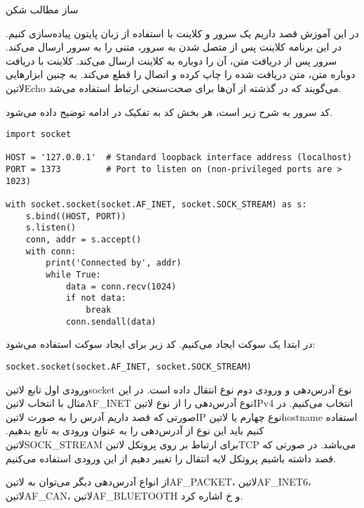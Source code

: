 \documentclass[]{article}
\begin{document}
  ‌ساز
  ‌مطالب
  ‌شکن

  در این آموزش قصد داریم یک سرور و کلاینت‌ با استفاده از زبان پایتون پیاده‌سازی کنیم.
  در این برنامه کلاینت‌ پس از متصل شدن به سرور، متنی را به سرور ارسال می‌کند.
  سرور پس از دریافت متن، آن را دوباره به کلاینت‌ ارسال می‌کند. کلاینت‌ با دریافت‌ دوباره متن، متن دریافت شده را چاپ کرده و اتصال را قطع می‌کند.
  به چنین ابزارهایی ‌لاتین{Echo} می‌گویند که در گذشته از آن‌ها برای صحت‌سنجی ارتباط استفاده می‌شد.


  کد سرور به شرح زیر است، هر بخش کد به تفکیک در ادامه توضیح داده می‌شود.

  \begin{latin}
  \begin{verbatim}
import socket

HOST = '127.0.0.1'  # Standard loopback interface address (localhost)
PORT = 1373         # Port to listen on (non-privileged ports are > 1023)

with socket.socket(socket.AF_INET, socket.SOCK_STREAM) as s:
    s.bind((HOST, PORT))
    s.listen()
    conn, addr = s.accept()
    with conn:
        print('Connected by', addr)
        while True:
            data = conn.recv(1024)
            if not data:
                break
            conn.sendall(data)
  \end{verbatim}
  \end{latin}

 در ابتدا یک سوکت‌ ایجاد می‌کنیم. کد زیر برای ایجاد سوکت‌ استفاده می‌شود:

  \begin{latin}
  \begin{verbatim}
socket.socket(socket.AF_INET, socket.SOCK_STREAM)
  \end{verbatim}
  \end{latin}

  ورودی اول تابع ‌لاتین{socket} نوع آدرس‌دهی و ورودی دوم نوع انتقال داده است‌.
  در این مثال با انتخاب ‌لاتین{AF\_INET} نوع آدرس‌دهی را از نوع ‌لاتین{IPv4} انتخاب می‌کنیم‌.
  در صورتی که قصد داریم آدرس را به صورت ‌لاتین{IP} نوع چهارم یا ‌لاتین{hostname} استفاده کنیم
  باید این نوع از آدرس‌دهی را به عنوان ورودی به تابع بدهیم‌.
  ‌لاتین{SOCK\_STREAM} برای ارتباط بر روی پروتکل ‌لاتین{TCP} می‌باشد.
  در صورتی که قصد داشته باشیم پروتکل لایه انتقال را تغییر دهیم از این ورودی استفاده می‌کنیم.

  از انواع آدرس‌دهی دیگر می‌توان به ‌لاتین{AF\_PACKET}، ‌لاتین{AF\_INET6}، ‌لاتین{AF\_CAN}، ‌لاتین{AF\_BLUETOOTH} و ‌خ اشاره کرد.
\end{document}
